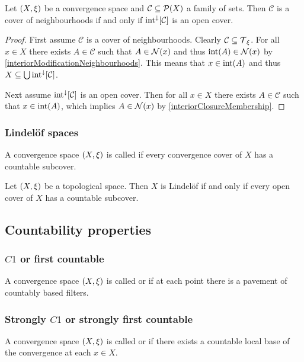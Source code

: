 \begin{lemma}
Let $\sSet{X,\xi}$ be a convergence space and $\mathcal{C}\subseteq \operatorname{\mathcal{P}}(X)$ a family of sets. Then $\mathcal{C}$ is a cover of neighbourhoods \textup{if and only if} $\operatorname{int}^\downarrow[\mathcal{C}]$ is an open cover.
\end{lemma}
\begin{proof}
First assume $\mathcal{C}$ is a cover of neighbourhoods. Clearly $\mathcal{C} \subseteq \operatorname{\mathcal{T}}_\xi$. For all $x\in X$ there exists $A\in \mathcal{C}$ such that $A\in \operatorname{\mathcal{N}}(x)$ and thus $\operatorname{int}(A) \in \operatorname{\mathcal{N}}(x)$ by \ref{interiorModificationNeighbourhoods}. This means that $x\in \operatorname{int}(A)$ and thus $X\subseteq \bigcup\operatorname{int}^\downarrow[\mathcal{C}]$.

Next assume $\operatorname{int}^\downarrow[\mathcal{C}]$ is an open cover. Then for all $x\in X$ there exists $A\in \mathcal{C}$ such that $x\in \operatorname{int}(A)$, which implies $A\in \operatorname{\mathcal{N}}(x)$ by \ref{interiorClosureMembership}.
\end{proof}

\subsubsection{Lindelöf spaces}
\begin{definition}
A convergence space $\sSet{X, \xi}$ is called  if every convergence cover of $X$ has a countable subcover.
\end{definition}

\begin{lemma}
Let $\sSet{X, \xi}$ be a topological space. Then $X$ is Lindelöf \textup{if and only if} every open cover of $X$ has a countable subcover.
\end{lemma}

\subsection{Countability properties}
\subsubsection{$C1$ or first countable}
\begin{definition}
A convergence space $\sSet{X, \xi}$ is called  or  if at each point there is a pavement of countably based filters.
\end{definition}

\subsubsection{Strongly $C1$ or strongly first countable}
\begin{definition}
A convergence space $\sSet{X, \xi}$ is called  or  if there exists a countable local base of the convergence at each $x\in X$.
\end{definition}


